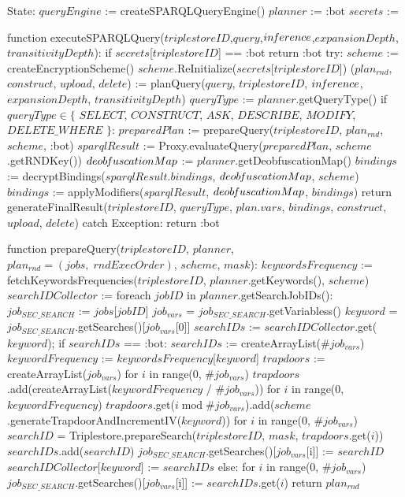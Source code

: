 State:
    $queryEngine$ := createSPARQLQueryEngine()
    $planner$ := :bot
    $secrets$ := {}

function executeSPARQLQuery($triplestoreID$,$query$,$in\textrm{\emph{f}}erence$,$expansionDepth$,$transitivityDepth$):
    if $secrets$[$triplestoreID$] == :bot
        return :bot
    try:
        $scheme$ := createEncryptionScheme()
        $scheme$.ReInitialize($secrets$[$triplestoreID$])
        ($plan_{rnd}$, $construct$, $upload$, $delete$) := planQuery($query$, $triplestoreID$, $in\textrm{\emph{f}}erence$, $expansionDepth$, $transitivityDepth$) 
        $queryType$ := $planner$.getQueryType()
        if $queryType \in \{$ $SELECT$, $CONSTRUCT$, $ASK$, $DESCRIBE$, $MODIFY$, $DELETE\_WHERE$ $\}$:
            $preparedPlan$ := prepareQuery($triplestoreID$, $plan_{rnd}$, $scheme$, :bot)
            $sparqlResult$ := Proxy.evaluateQuery($preparedPlan$, $scheme$.getRNDKey())
            $deob\textrm{\emph{f}}uscationMap$ := $planner$.getDeobfuscationMap()
            $bindings$ := decryptBindings($sparqlResult$.$bindings$, $deob\textrm{\emph{f}}uscationMap$, $scheme$)
            $bindings$ := applyModifiers($sparqlResult$, $deob\textrm{\emph{f}}uscationMap$, $bindings$)
        return generateFinalResult($triplestoreID$, $queryType$, $plan$.$vars$, $bindings$, $construct$, $upload$, $delete$)
    catch Exception:
        return :bot

function prepareQuery($triplestoreID$, $planner$, $plan_{rnd} = (jobs, \; rndExecOrder)$, $scheme$, $mask$):
    $keywordsFrequency$ := fetchKeywordsFrequencies($triplestoreID$, $planner$.getKeywords(), $scheme$)
    $searchIDCollector$ := {}
    foreach $jobID$ in $planner$.getSearchJobIDs():
        $job_{SEC\_SEARCH}$ := $jobs$[$jobID$]
        $job_{vars}$ = $job_{SEC\_SEARCH}$.getVariabless()
        $keyword$ = $job_{SEC\_SEARCH}$.getSearches()[$job_{vars}$[0]]
        $searchIDs$ := $searchIDCollector$.get($keyword$);
        if $searchIDs$ == :bot:
            $searchIDs$ := createArrayList($\#job_{vars}$)
            $keywordFrequency$ := $keywordsFrequency$[$keyword$]
            $trapdoors$ := createArrayList($job_{vars}$)
            for $i$ in range(0, $\#job_{vars}$)
                $trapdoors$.add(createArrayList($keywordFrequency$ / $\#job_{vars}$))
            for $i$ in range(0, $keywordFrequency$)
                $trapdoors$.get($i \; \textrm{mod} \; \#job_{vars}$).add($scheme$.generateTrapdoorAndIncrementIV($keyword$))
            for $i$ in range(0, $\#job_{vars}$)
                $searchID$ = Triplestore.prepareSearch($triplestoreID$, $mask$, $trapdoors$.get($i$))
                $searchIDs$.add($searchID$)
                $job_{SEC\_SEARCH}$.getSearches()[$job_{vars}$[i]] := $searchID$
            $searchIDCollector$[$keyword$] := $searchIDs$
        else:
            for $i$ in range(0, $\#job_{vars}$)
                $job_{SEC\_SEARCH}$.getSearches()[$job_{vars}$[i]] := $searchIDs$.get($i$)
    return $plan_{rnd}$